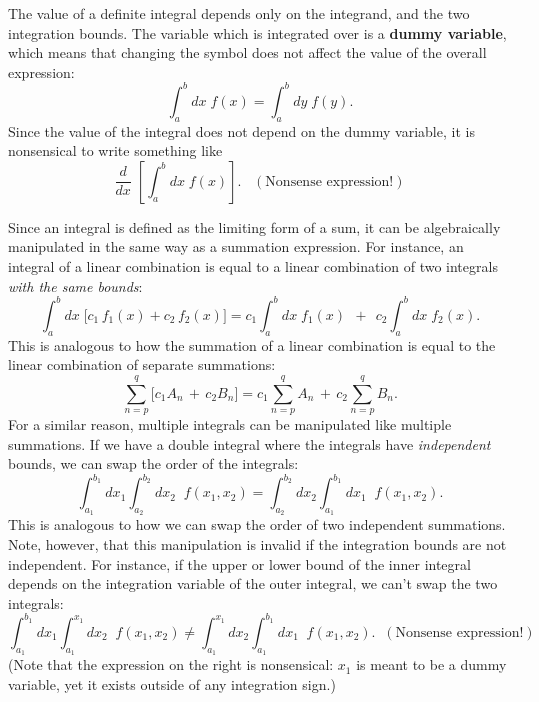 \documentclass[10pt,a4paper]{article}
\begin{document}
The value of a definite integral depends only on the integrand, and the
two integration bounds. The variable which is integrated over is a
\textbf{dummy variable}, which means that changing the symbol does not
affect the value of the overall expression:
\begin{equation}
\int_a^b dx\; f(x) = \int_a^b dy\; f(y).
\end{equation}
Since the value of the integral does not depend on the dummy variable,
it is nonsensical to write something like
\begin{equation*}
\frac{d}{dx}\; \left[\int_a^b dx\; f(x)\right]. \;\;\;(\text{Nonsense expression}!)
\end{equation*}

Since an integral is defined as the limiting form of a sum, it can be
algebraically manipulated in the same way as a summation expression. For
instance, an integral of a linear combination is equal to a linear
combination of two integrals \emph{with the same bounds}:
\begin{equation}
\int_a^b dx \;\Big[c_1 \,f_1(x) + c_2\, f_2(x)\Big] = c_1 \int_{a}^{b} dx \; f_1(x)\;\, +\;\, c_2 \int_{a}^{b} dx\; f_2(x).
\end{equation}
This is analogous to how the summation of a linear combination is equal
to the linear combination of separate summations:
\begin{equation}
\sum_{n = p}^{q} \Big[ c_1  A_n \, + \, c_2 B_n\Big] = c_1 \sum_{n = p}^{q} A_n \, + \, c_2 \sum_{n = p}^{q} B_n.
\end{equation}
For a similar reason, multiple integrals can be manipulated like
multiple summations. If we have a double integral where the integrals
have \emph{independent} bounds, we can swap the order of the integrals:
\begin{equation}
  \int_{a_1}^{b_1} dx_1 \int_{a_2}^{b_2} dx_2 \;\; f(x_1, x_2)
  = \int_{a_2}^{b_2} dx_2 \int_{a_1}^{b_1} dx_1 \;\; f(x_1, x_2).
\end{equation}
This is analogous to how we can swap the order of two independent
summations. Note, however, that this manipulation is invalid if the
integration bounds are not independent. For instance, if the upper or
lower bound of the inner integral depends on the integration variable of
the outer integral, we can't swap the two integrals:
\begin{equation*}
\int_{a_1}^{b_1} dx_1 \int_{a_1}^{x_1} dx_2 \;\; f(x_1, x_2) \ne \int_{a_1}^{x_1} dx_2 \int_{a_1}^{b_1} dx_1 \;\; f(x_1, x_2).\;\; (\text{Nonsense expression}!)
\end{equation*}
(Note that the expression on the right is nonsensical: $x_1$ is meant
to be a dummy variable, yet it exists outside of any integration sign.)
\end{document}
